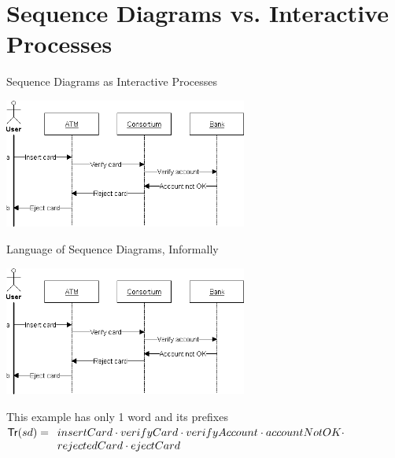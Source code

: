 \documentclass[aspectratio=169]{beamer}
\begin{document}
\section{Sequence Diagrams vs. Interactive Processes}


\begin{slide}{Sequence Diagrams as Interactive Processes}
  \centering

  \includegraphics[width=0.6\textwidth]{images/sd-simple-atm.png}

\end{slide}

\begin{slide}{Language of Sequence Diagrams, Informally}
  \centering

  \includegraphics[width=0.6\textwidth]{images/sd-simple-atm.png}

  \begin{exampleblock}{This example has only 1 word and its prefixes}
   $\mathsf{Tr}(sd) = \begin{array}[t]{l}
      insertCard \cdot verifyCard \cdot verifyAccount \cdot accountNotOK \cdot \\ rejectedCard \cdot ejectCard
      \end{array}$
  \end{exampleblock}
\end{slide}
\end{document}
